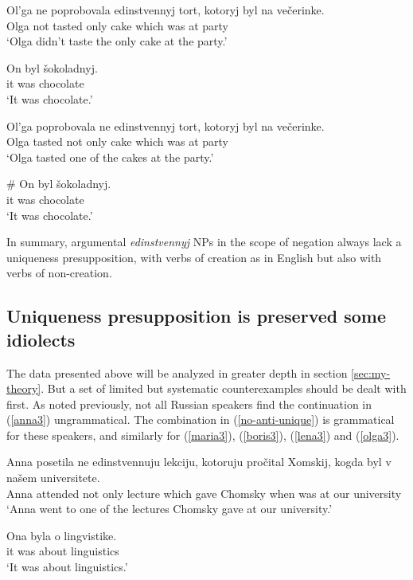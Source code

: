 \begin{exe}
	\ex \begin{xlist}
		\ex \gll Ol'ga ne poprobovala edinstvennyj tort, kotoryj byl na ve\v{c}erinke.\\
		Olga not tasted only cake which was at party\\
		\glt `Olga didn't taste the only cake at the party.'

		\ex \gll On byl \v{s}okoladnyj.\\
		it was chocolate\\
		\glt `It was chocolate.'
	\end{xlist}

	\ex \label{olga3} \begin{xlist}
		\ex \gll Ol'ga poprobovala ne edinstvennyj tort, kotoryj byl na ve\v{c}erinke.\\
		Olga tasted not only cake which was at party\\
		\glt `Olga tasted one of the cakes at the party.'

		\ex \gll \# On byl \v{s}okoladnyj.\\
		{} it was chocolate\\
		\glt `It was chocolate.'
	\end{xlist}
\end{exe}

In summary, argumental \textit{edinstvennyj} NPs in the scope of negation always lack a uniqueness presupposition, with verbs of creation as in English but also with verbs of non-creation.

\subsection{Uniqueness presupposition is preserved some idiolects \label{sec:no-anti-unique}}
The data presented above will be analyzed in greater depth in section \ref{sec:my-theory}. But a set of limited but systematic counterexamples should be dealt with first. As noted previously, not all Russian speakers find the continuation in (\ref{anna3}) ungrammatical. The combination in (\ref{no-anti-unique}) is grammatical for these speakers, and similarly for (\ref{maria3}), (\ref{boris3}), (\ref{lena3}) and (\ref{olga3}).

\begin{exe}
	\ex \label{no-anti-unique} \begin{xlist}
		\ex \gll Anna posetila ne edinstvennuju lekciju, kotoruju pro\v{c}ital Xomskij, kogda byl v na\v{s}em universitete.\\
		Anna attended not only lecture which gave Chomsky when was at our university\\
		\glt `Anna went to one of the lectures Chomsky gave at our university.'

		\ex \gll Ona byla o lingvistike.\\
		it was about linguistics\\
		\glt `It was about linguistics.'
	\end{xlist}
\end{exe}

